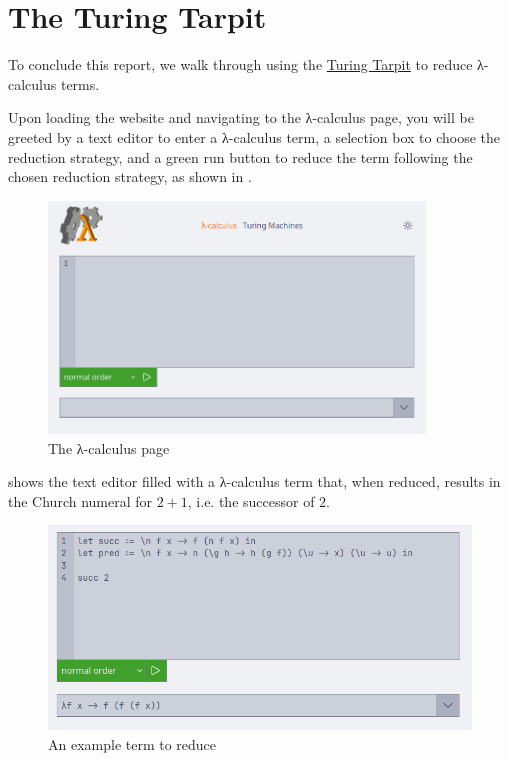 \documentclass[headings=standardclasses]{scrartcl}
\theoremstyle{definition}
\begin{document}
\section{The Turing Tarpit}

To conclude this report, we walk through using the
\href{https://turing-tarpit.netlify.app/}{Turing Tarpit} to reduce λ-calculus
terms.

Upon loading the website and navigating to the λ-calculus page, you will be
greeted by a text editor to enter a λ-calculus term, a selection box to choose
the reduction strategy, and a green run button to reduce the term following the
chosen reduction strategy, as shown in .

\begin{figure}[h]
  \centering
  \includegraphics[width=10cm]{empty.png}
  \caption{The λ-calculus page}
  \label{fig:lam_empty}
\end{figure}

 shows the text editor filled with a λ-calculus term that,
when reduced, results in the Church numeral for \(2 + 1\), i.e. the successor of
\(2\).

\begin{figure}[h]
  \centering
  \includegraphics[width=12cm]{filled.png}
  \caption{An example term to reduce}
  \label{fig:lam_filled}
\end{figure}
\end{document}
